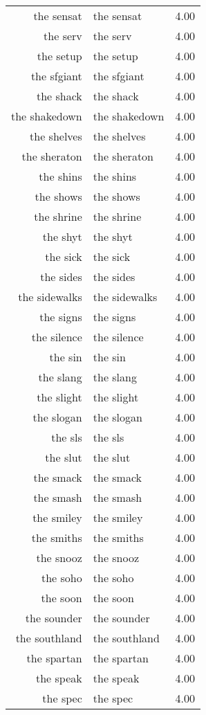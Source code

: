 \begin{table}[ht]
\begin{tabular}{rlr}
  the sensat & the sensat & 4.00 \\ 
  the serv & the serv & 4.00 \\ 
  the setup & the setup & 4.00 \\ 
  the sfgiant & the sfgiant & 4.00 \\ 
  the shack & the shack & 4.00 \\ 
  the shakedown & the shakedown & 4.00 \\ 
  the shelves & the shelves & 4.00 \\ 
  the sheraton & the sheraton & 4.00 \\ 
  the shins & the shins & 4.00 \\ 
  the shows & the shows & 4.00 \\ 
  the shrine & the shrine & 4.00 \\ 
  the shyt & the shyt & 4.00 \\ 
  the sick & the sick & 4.00 \\ 
  the sides & the sides & 4.00 \\ 
  the sidewalks & the sidewalks & 4.00 \\ 
  the signs & the signs & 4.00 \\ 
  the silence & the silence & 4.00 \\ 
  the sin & the sin & 4.00 \\ 
  the slang & the slang & 4.00 \\ 
  the slight & the slight & 4.00 \\ 
  the slogan & the slogan & 4.00 \\ 
  the sls & the sls & 4.00 \\ 
  the slut & the slut & 4.00 \\ 
  the smack & the smack & 4.00 \\ 
  the smash & the smash & 4.00 \\ 
  the smiley & the smiley & 4.00 \\ 
  the smiths & the smiths & 4.00 \\ 
  the snooz & the snooz & 4.00 \\ 
  the soho & the soho & 4.00 \\ 
  the soon & the soon & 4.00 \\ 
  the sounder & the sounder & 4.00 \\ 
  the southland & the southland & 4.00 \\ 
  the spartan & the spartan & 4.00 \\ 
  the speak & the speak & 4.00 \\ 
  the spec & the spec & 4.00 \\ 

\end{tabular}
\end{table}
